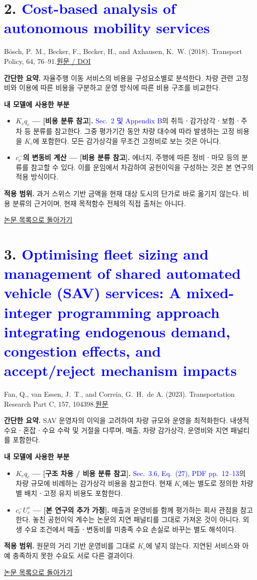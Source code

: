 \documentclass[10pt,a4paper]{article}
\newcommand{\boschtitle}{Cost-based analysis of autonomous mobility services}
\newcommand{\fantitle}{Optimising fleet sizing and management of shared automated vehicle (SAV) services: A mixed-integer programming approach integrating endogenous demand, congestion effects, and accept/reject mechanism impacts}
\newcommand{\backtolist}{\par\smallskip\hyperlink{paper:list}{논문 목록으로 돌아가기}\par}
\begin{document}
\section*{2. \textcolor{blue}{\boschtitle}}
{\color{blue}B\"osch, P.~M., Becker, F., Becker, H., and Axhausen, K.~W. (2018). Transport Policy, 64, 76--91.}\quad \href{https://doi.org/10.1016/j.tranpol.2017.09.005}{원문 / DOI}

\textbf{간단한 요약.} 자율주행 이동 서비스의 비용을 구성요소별로 분석한다. 차량 관련 고정비와 이용에 따른 비용을 구분하고 운영 방식에 따른 비용 구조를 비교한다.

\textbf{내 모델에 사용한 부분}
\begin{itemize}
\item \textbf{$K_cq_c$ --- [비용 분류 참고].} \textcolor{blue}{Sec.~2 및 Appendix B}의 취득ㆍ감가상각ㆍ보험ㆍ주차 등 분류를 참고한다. 그중 평가기간 동안 차량 대수에 따라 발생하는 고정 비용을 $K_c$에 포함한다. 모든 감가상각을 무조건 고정비로 보는 것은 아니다.
\item \textbf{$c_c^-$의 변동비 계산 --- [비용 분류 참고].} 에너지, 주행에 따른 정비ㆍ마모 등의 분류를 참고할 수 있다. 이를 운임에서 차감하여 공헌이익을 구성하는 것은 본 연구의 적용 방식이다.
\end{itemize}
\textbf{적용 범위.} 과거 스위스 기반 금액을 현재 대상 도시의 단가로 바로 옮기지 않는다. 비용 분류의 근거이며, 현재 목적함수 전체의 직접 출처는 아니다.
\backtolist

\newpage
\hypertarget{paper:fan}{}
\section*{3. \textcolor{blue}{\fantitle}}
{\color{blue}Fan, Q., van Essen, J.~T., and Correia, G.~H.~de A. (2023). Transportation Research Part C, 157, 104398.}\quad \href{https://pure.tudelft.nl/ws/portalfiles/portal/166828610/1_s2.0_S0968090X23003881_main.pdf}{원문}

\textbf{간단한 요약.} SAV 운영자의 이익을 고려하여 차량 규모와 운영을 최적화한다. 내생적 수요ㆍ혼잡ㆍ수요 수락 및 거절을 다루며, 매출, 차량 감가상각, 운영비와 지연 패널티를 포함한다.

\textbf{내 모델에 사용한 부분}
\begin{itemize}
\item \textbf{$K_cq_c$ --- [구조 차용 / 비용 분류 참고].} \textcolor{blue}{Sec.~3.6, Eq.~(27), PDF pp.~12--13}의 차량 규모에 비례하는 감가상각 비용을 참고한다. 현재 $K_c$에는 별도로 정의한 차량별 배치ㆍ고정 유지 비용도 포함한다.
\item \textbf{$c_c^-U_c^s$ --- [본 연구의 추가 가정].} 매출과 운영비를 함께 평가하는 회사 관점을 참고한다. 놓친 공헌이익 계수는 논문의 지연 패널티를 그대로 가져온 것이 아니다. 외생 수요 조건에서 매출ㆍ변동비를 미충족 수요 손실로 바꾸는 별도 해석이다.
\end{itemize}
\textbf{적용 범위.} 원문의 거리 기반 운영비를 그대로 $K_c$에 넣지 않는다. 지연된 서비스와 아예 충족하지 못한 수요도 서로 다른 결과이다.
\backtolist
\end{document}

